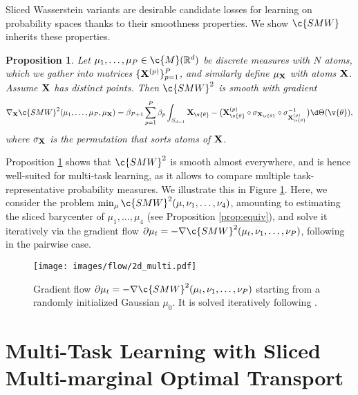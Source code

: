\documentclass{article}
\newtheorem{proposition}[theorem]{Proposition}
\begin{document}
Sliced Wasserstein variants are desirable candidate losses for learning on probability spaces thanks to their  smoothness properties. We show $\c{SMW}$ inherits these properties.


\begin{proposition}
\label{prop:differentiability}
Let $\mu_1, \ldots, \mu_P \in \c{M}(\R^d)$ be discrete measures with $N$ atoms, which we gather into matrices $\{\m{X}^{(p)}\}_{p=1}^P$, and similarly define $\mu_{\m{X}}$ with atoms $\m{X}$. Assume $\m{X}$ has distinct points. Then $\c{SMW}^2$ is smooth with gradient
\[
\nabla_{\m{X}} \c{SMW}^2(\mu_1,\ldots,\mu_P, \mu_{\m{X}}) =\beta_{P+1}\sum_{p=1}^{P} \beta_{p}\int_{S_{d-1}}\m{X}_{\v{\theta}}-\big(\m{X}_{\v{\theta}}^{(p)} \circ \sigma_{\m{X}_{\v{\theta}}} \circ \sigma^{-1}_{\m{X}^{(p)}_{\v{\theta}}} \big) \d\Theta(\v{\theta}),
\]
where $\sigma_{\m{X}}$ is the permutation that sorts atoms of $\m{X}$.
\end{proposition}

Proposition \ref{prop:differentiability} shows that $\c{SMW}^2$ is smooth almost everywhere, and is hence well-suited for multi-task learning, as it allows to compare multiple task-representative probability measures.
We illustrate this in Figure \ref{fig:differentiability}. Here, we consider the problem $\min_{\mu}\c{SMW}^2(\mu, \nu_1,\ldots,\nu_4)$,  amounting to estimating the sliced barycenter of $\mu_1,\ldots,\mu_4$ (see Proposition \ref{prop:equiv}), and solve it iteratively via the gradient flow $\partial\mu_t  = -\nabla \c{SMW}^2(\mu_t, \nu_1,\ldots, \nu_P)$, following \textcite{bonneel} in the pairwise case. 



\begin{figure}
  \begin{center}
    \texttt{[image: images/flow/2d\_multi.pdf]}
  \end{center}
  \caption{Gradient flow $\partial \mu_t = -\nabla \c{SMW}^2(\mu_t, \nu_1,\ldots, \nu_P)$ starting from a randomly initialized Gaussian $\mu_0$. It is solved iteratively following \textcite{bonneel}.}
  \label{fig:differentiability}
\end{figure}


\section{Multi-Task Learning with Sliced Multi-marginal Optimal Transport}
\end{document}
